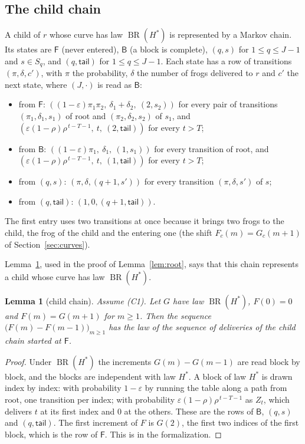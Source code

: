 \documentclass[11pt]{amsart}
\newtheorem{lemma}[theorem]{Lemma}
\theoremstyle{definition}
\numberwithin{equation}{section}
\newcommand{\lean}[1]{\ignorespaces}
\newcommand{\BR}{\operatorname{BR}}
\newcommand{\eps}{\varepsilon}
\begin{document}
\subsection{The child chain}
A child of $r$ whose curve has law $\BR(H^*)$ is represented by a Markov chain. Its states are $\mathsf F$ (never entered), $\mathsf B$ (a block is complete), $(q,s)$ for $1\le q\le J-1$ and $s\in S_q$, and $(q,\mathsf{tail})$ for $1\le q\le J-1$. Each state has a row of transitions $(\pi,\delta,c')$, with $\pi$ the probability, $\delta$ the number of frogs delivered to $r$ and $c'$ the next state, where $(J,\cdot)$ is read as $\mathsf B$:
\begin{itemize}
\item from $\mathsf F$: $((1-\eps)\pi_1\pi_2,\ \delta_1+\delta_2,\ (2,s_2))$ for every pair of transitions $(\pi_1,\delta_1,s_1)$ of $\mathrm{root}$ and $(\pi_2,\delta_2,s_2)$ of $s_1$, and $(\eps(1-\rho)\rho^{\,t-T-1},\ t,\ (2,\mathsf{tail}))$ for every $t>T$;
\item from $\mathsf B$: $((1-\eps)\pi_1,\ \delta_1,\ (1,s_1))$ for every transition of $\mathrm{root}$, and $(\eps(1-\rho)\rho^{\,t-T-1},\ t,\ (1,\mathsf{tail}))$ for every $t>T$;
\item from $(q,s)$: $(\pi,\delta,(q+1,s'))$ for every transition $(\pi,\delta,s')$ of $s$;
\item from $(q,\mathsf{tail})$: $(1,0,(q+1,\mathsf{tail}))$.
\end{itemize}
The first entry uses two transitions at once because it brings two frogs to the child, the frog of the child and the entering one (the shift $F_c(m)=G_c(m+1)$ of Section~\ref{sec:curves}).

Lemma~\ref{lem:child}, used in the proof of Lemma~\ref{lem:root}, says that this chain represents a child whose curve has law $\BR(H^*)$.

\begin{lemma}[child chain]\label{lem:child}\lean{FrogModel.LemmaX.childLaw_holds, FrogModel.LemmaX.ChildLaw, FrogModel.LemmaX.childPsiLaw_holds, FrogModel.LemmaX.rowLaw_holds}
Assume (C1). Let $G$ have law $\BR(H^*)$, $F(0)=0$ and $F(m)=G(m+1)$ for $m\ge1$. Then the sequence $\bigl(F(m)-F(m-1)\bigr)_{m\ge1}$ has the law of the sequence of deliveries of the child chain started at $\mathsf F$.
\end{lemma}

\begin{proof}
Under $\BR(H^*)$ the increments $G(m)-G(m-1)$ are read block by block, and the blocks are independent with law $H^*$. A block of law $H^*$ is drawn index by index: with probability $1-\eps$ by running the table along a path from $\mathrm{root}$, one transition per index; with probability $\eps(1-\rho)\rho^{\,t-T-1}$ as $Z_t$, which delivers $t$ at its first index and $0$ at the others. These are the rows of $\mathsf B$, $(q,s)$ and $(q,\mathsf{tail})$. The first increment of $F$ is $G(2)$, the first two indices of the first block, which is the row of $\mathsf F$. This is  in the formalization.
\end{proof}
\end{document}
